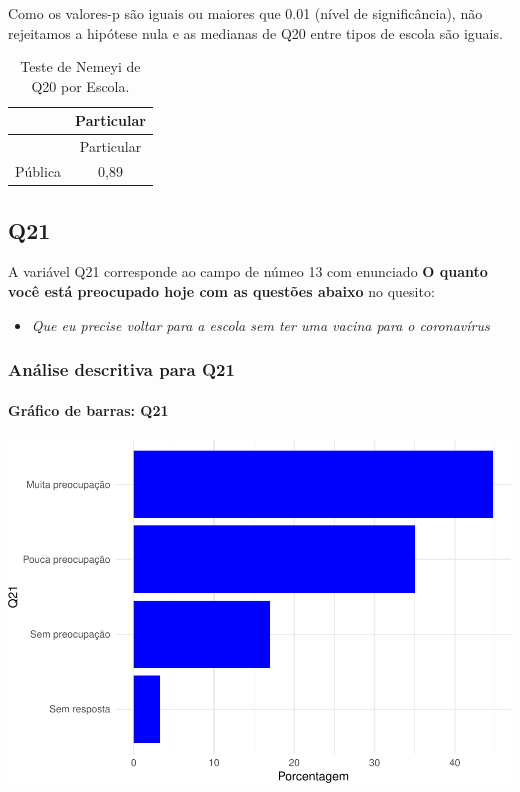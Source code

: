 \documentclass[]{article}
\providecommand{\tightlist}{%
  \setlength{\itemsep}{0pt}\setlength{\parskip}{0pt}}
\let\oldparagraph\paragraph
\renewcommand{\paragraph}[1]{\oldparagraph{#1}\mbox{}}
\begin{document}
Como os valores-p são iguais ou maiores que 0.01 (nível de significância), não rejeitamos a hipótese nula e as medianas de Q20 entre tipos de escola são iguais.

\begin{longtable}[]{@{}lc@{}}
\caption{\label{tab:unnamed-chunk-416}Teste de Nemeyi de Q20 por Escola.}\tabularnewline
\toprule
& Particular\tabularnewline
\midrule
\endfirsthead
\toprule
& Particular\tabularnewline
\midrule
\endhead
Pública & 0,89\tabularnewline
\bottomrule
\end{longtable}

\cleardoublepage

\hypertarget{q21}{%
\subsection{Q21}\label{q21}}

A variável Q21 corresponde ao campo de númeo 13 com enunciado \textbf{O quanto você está preocupado hoje com as questões abaixo} no quesito:

\begin{itemize}
\tightlist
\item
  \emph{Que eu precise voltar para a escola sem ter uma vacina para o coronavírus}
\end{itemize}

\hypertarget{anuxe1lise-descritiva-para-q21}{%
\subsubsection{Análise descritiva para Q21}\label{anuxe1lise-descritiva-para-q21}}

\hypertarget{gruxe1fico-de-barras-q21}{%
\paragraph{Gráfico de barras: Q21}\label{gruxe1fico-de-barras-q21}}

\begin{center}\includegraphics[width=0.75\linewidth]{relatorio_covid19_files/figure-latex/unnamed-chunk-423-1} \end{center}
\end{document}
